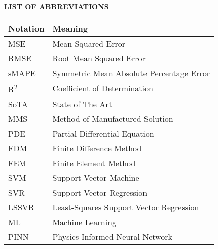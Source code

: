 \clearpage
{}
\begin{center}
  \Large \textbf{LIST OF ABBREVIATIONS}
\end{center}
\vspace{3em}

\begin{center}
  \begin{tabularx}{0.8\textwidth}{>{\raggedright\arraybackslash}X>{\raggedright\arraybackslash}X}
    \toprule
    \textbf{Notation}    & \textbf{Meaning}                         \\
    \midrule
    MSE                  & Mean Squared Error                       \\
    RMSE                 & Root Mean Squared Error                  \\
    sMAPE                & Symmetric Mean Absolute Percentage Error \\
    R\textsuperscript{2} & Coefficient of Determination             \\
    SoTA                 & State of The Art                         \\
    MMS                  & Method of Manufactured Solution           \\
    PDE                  & Partial Differential Equation            \\
    FDM                  & Finite Difference Method                 \\
    FEM                  & Finite Element Method                    \\
    SVM                  & Support Vector Machine                   \\
    SVR                  & Support Vector Regression                \\
    LSSVR                & Least-Squares Support Vector Regression  \\
    ML                   & Machine Learning                         \\
    PINN                 & Physics-Informed Neural Network          \\

    \bottomrule
  \end{tabularx}
\end{center}